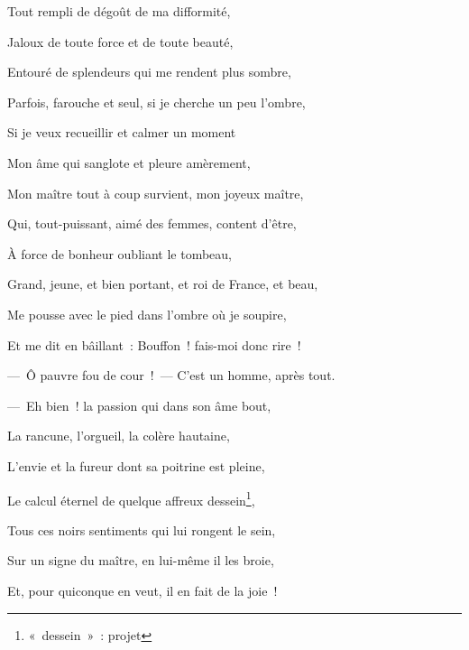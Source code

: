 {Tout rempli de dégoût de ma difformité,

Jaloux de toute force et de toute beauté,

Entouré de splendeurs qui me rendent plus sombre,

Parfois, farouche et seul, si je cherche un peu l'ombre,

Si je veux recueillir et calmer un moment

Mon âme qui sanglote et pleure amèrement,

Mon maître tout à coup survient, mon joyeux maître,

Qui, tout-puissant, aimé des femmes, content d'être,

À force de bonheur oubliant le tombeau,

Grand, jeune, et bien portant, et roi de France, et beau,

Me pousse avec le pied dans l'ombre où je soupire,

Et me dit en bâillant~: Bouffon~! fais-moi donc rire~!

---~Ô pauvre fou de cour~!~--- C'est un homme, après tout.

---~Eh bien~! la passion qui dans son âme bout,

La rancune, l'orgueil, la colère hautaine,

L'envie et la fureur dont sa poitrine est pleine,

Le calcul éternel de quelque affreux dessein\footnote{«~dessein~»~:
projet},

Tous ces noirs sentiments qui lui rongent le sein,

Sur un signe du maître, en lui-même il les broie,

Et, pour quiconque en veut, il en fait de la joie~!\setlength{\parskip}{6pt}
}



